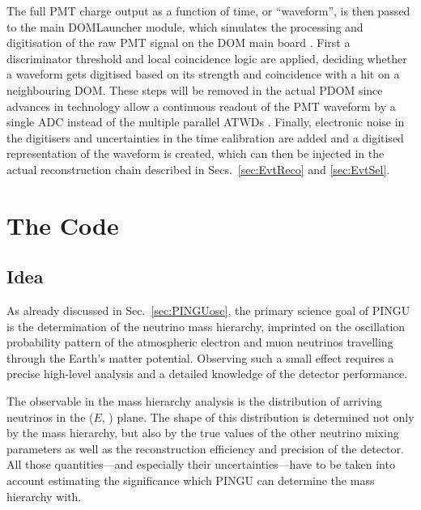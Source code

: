The full PMT charge output as a function of time, or ``waveform'', is then
passed to the main DOMLauncher module, which simulates the processing and
digitisation of the raw PMT signal on the DOM main board \cite{DOMLauncher}.
First
a discriminator threshold and local coincidence logic are applied, deciding
whether a waveform gets digitised based on its strength and coincidence with a
hit on a neighbouring DOM. These steps will be removed in the actual PDOM since
advances in technology allow a continuous readout of the PMT waveform by a
single ADC instead of the multiple parallel ATWDs \cite{PDOM_Aachen}. Finally,
electronic noise in the digitisers and uncertainties in the time calibration are
added and a digitised representation of the waveform is created, which can then
be injected in the actual reconstruction chain described in
Secs.~\ref{sec:EvtReco} and \ref{sec:EvtSel}.

\section{The \papa Code}
\label{sec:papa}

\subsection{Idea}
\label{sec:sim_idea}

As already discussed in Sec.~\ref{sec:PINGUosc}, the primary science goal of
PINGU is the determination of the neutrino mass hierarchy, imprinted on the
oscillation probability pattern of the atmospheric electron and muon neutrinos
travelling through the Earth's matter potential. Observing such a small effect
requires a precise high-level analysis and a detailed knowledge of the detector 
performance. 

The observable in the mass hierarchy analysis is the distribution of arriving 
neutrinos in the ($E$, \coszen) plane. The shape of this distribution is 
determined not only by the mass hierarchy, but also by the true values of the 
other neutrino mixing parameters as well as the reconstruction efficiency and
precision of the detector. All those quantities---and especially their 
uncertainties---have to be taken into account estimating the significance 
which PINGU can determine the mass hierarchy with.

